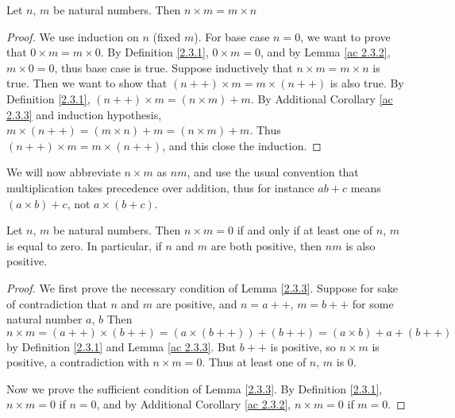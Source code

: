 \begin{lemma}\label{2.3.2}
Let \(n\), \(m\) be natural numbers.
Then \(n \times m = m \times n\)
\end{lemma}

\begin{proof}
We use induction on \(n\) (fixed \(m\)).
For base case \(n = 0\), we want to prove that \(0 \times m = m \times 0\).
By Definition \ref{2.3.1}, \(0 \times m = 0\), and by Lemma \ref{ac 2.3.2}, \(m \times 0 = 0\), thus base case is true.
Suppose inductively that \(n \times m = m \times n\) is true.
Then we want to show that \((n++) \times m = m \times (n++)\) is also true.
By Definition \ref{2.3.1}, \((n++) \times m = (n \times m) + m\).
By Additional Corollary \ref{ac 2.3.3} and induction hypothesis, \(m \times (n++) = (m \times n) + m = (n \times m) + m\).
Thus \((n++) \times m = m \times (n++)\), and this close the induction.
\end{proof}

\begin{note}
We will now abbreviate \(n \times m\) as \(nm\), and use the usual convention that multiplication takes precedence over addition, thus for instance \(ab + c\) means \((a \times b) + c\), not \(a \times (b + c)\).
\end{note}

\begin{lemma}\label{2.3.3}
Let \(n\), \(m\) be natural numbers.
Then \(n \times m = 0\) if and only if at least one of \(n\), \(m\) is equal to zero.
In particular, if \(n\) and \(m\) are both positive, then \(nm\) is also positive.
\end{lemma}

\begin{proof}
We first prove the necessary condition of Lemma \ref{2.3.3}.
Suppose for sake of contradiction that \(n\) and \(m\) are positive, and \(n = a++\), \(m = b++\) for some natural number \(a\), \(b\)
Then \(n \times m = (a++) \times (b++) = (a \times (b++)) + (b++) = (a \times b) + a + (b++)\) by Definition \ref{2.3.1} and Lemma \ref{ac 2.3.3}.
But \(b++\) is positive, so \(n \times m\) is positive, a contradiction with \(n \times m = 0\).
Thus at least one of \(n\), \(m\) is \(0\).

Now we prove the sufficient condition of Lemma \ref{2.3.3}.
By Definition \ref{2.3.1}, \(n \times m = 0\) if \(n = 0\), and by Additional Corollary \ref{ac 2.3.2}, \(n \times m = 0\) if \(m = 0\).
\end{proof}

